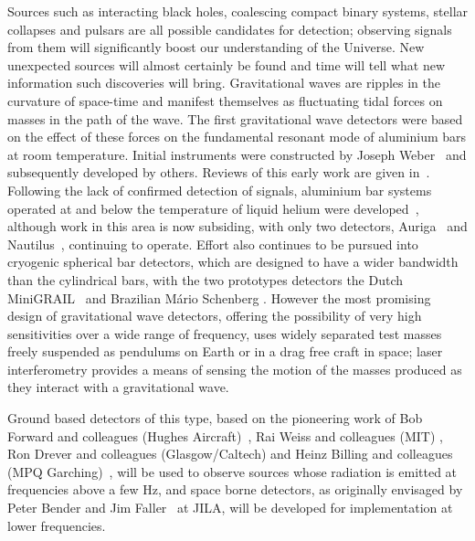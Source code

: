 \documentclass{article}
\begin{document}
Sources such as interacting black holes, coalescing compact binary systems,
stellar collapses and pulsars are all possible candidates for detection;
observing signals from them will significantly boost our understanding of the
Universe. New unexpected sources will almost certainly be found and time will
tell what new information such discoveries will bring. Gravitational waves are
ripples in the curvature of space-time and manifest themselves as fluctuating
tidal forces on masses in the path of the wave. The first gravitational wave
detectors were based on the effect of these forces on the fundamental resonant
mode of aluminium bars at room temperature. Initial instruments were constructed
by Joseph Weber~\cite{Weber1, Weber2} and subsequently developed by others.
Reviews of this early work are given in~\cite{Tyson, Douglass}. Following the
lack of confirmed detection of signals, aluminium bar systems operated at and
below the temperature of liquid helium were developed~\cite{Astone, Prodi,
Amaldi, Heng}, although work in this area is now subsiding, with only two
detectors, Auriga~\cite{AURIGA} and Nautilus~\cite{NAUTILUS}, continuing to
operate. Effort also continues to be pursued into cryogenic spherical bar
detectors, which are designed to have a wider bandwidth than the cylindrical
bars, with the two prototypes detectors the Dutch MiniGRAIL~\cite{MiniGRAIL,
Gottardi:2007} and Brazilian M\'{a}rio Schenberg \cite{Schenberg, Aguiar:2006}.
However the most promising design of gravitational wave detectors, offering the
possibility of very high sensitivities over a wide range of frequency, uses
widely separated test masses freely suspended as pendulums on Earth or in a drag
free craft in space; laser interferometry provides a means of sensing the motion
of the masses produced as they interact with a gravitational wave.

Ground based detectors of this type, based on the pioneering work of Bob Forward
and colleagues (Hughes Aircraft)~\cite{Forward}, Rai Weiss and colleagues (MIT)
\cite{Weiss}, Ron Drever and colleagues (Glasgow/Caltech) \cite{Drever1,
Drever2} and Heinz Billing and colleagues (MPQ Garching)~\cite{Billing}, will be
used to observe sources whose radiation is emitted at frequencies above a few
Hz, and space borne detectors, as originally envisaged by Peter Bender and Jim
Faller~\cite{BenderFaller1, BenderFaller2} at JILA, will be developed for
implementation at lower frequencies.
\end{document}
